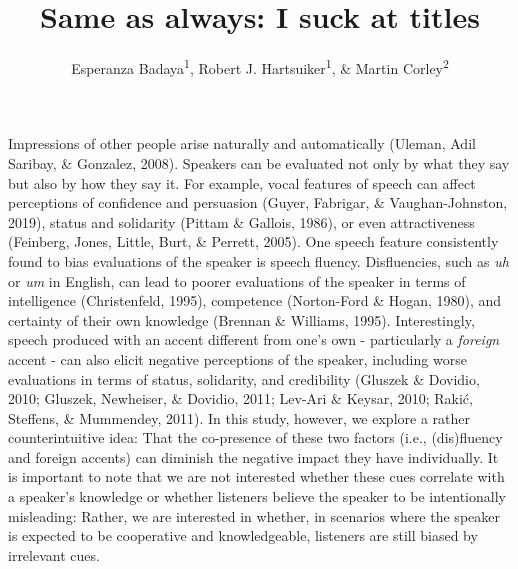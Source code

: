 \documentclass[
  man,floatsintext]{apa7}
\title{Same as always: I suck at titles}
\author{Esperanza Badaya\textsuperscript{1}, Robert J. Hartsuiker\textsuperscript{1}, \& Martin Corley\textsuperscript{2}}
\date{}
\affiliation{\vspace{0.5cm}\textsuperscript{1} Ghent University\\\textsuperscript{2} University of Edinburgh}
\begin{document}
\maketitle

Impressions of other people arise naturally and automatically (Uleman, Adil Saribay, \& Gonzalez, 2008). Speakers can be evaluated not only by what they say but also by how they say it. For example, vocal features of speech can affect perceptions of confidence and persuasion (Guyer, Fabrigar, \& Vaughan-Johnston, 2019), status and solidarity (Pittam \& Gallois, 1986), or even attractiveness (Feinberg, Jones, Little, Burt, \& Perrett, 2005). One speech feature consistently found to bias evaluations of the speaker is speech fluency. Disfluencies, such as \emph{uh} or \emph{um} in English, can lead to poorer evaluations of the speaker in terms of intelligence (Christenfeld, 1995), competence (Norton-Ford \& Hogan, 1980), and certainty of their own knowledge (Brennan \& Williams, 1995). Interestingly, speech produced with an accent different from one's own - particularly a \emph{foreign} accent - can also elicit negative perceptions of the speaker, including worse evaluations in terms of status, solidarity, and credibility (Gluszek \& Dovidio, 2010; Gluszek, Newheiser, \& Dovidio, 2011; Lev-Ari \& Keysar, 2010; Rakić, Steffens, \& Mummendey, 2011). In this study, however, we explore a rather counterintuitive idea: That the co-presence of these two factors (i.e., (dis)fluency and foreign accents) can diminish the negative impact they have individually. It is important to note that we are not interested whether these cues correlate with a speaker's knowledge or whether listeners believe the speaker to be intentionally misleading: Rather, we are interested in whether, in scenarios where the speaker is expected to be cooperative and knowledgeable, listeners are still biased by irrelevant cues.
\end{document}
